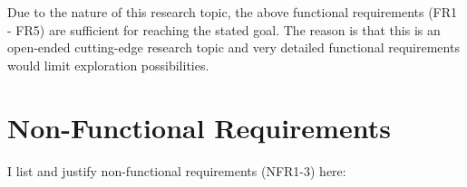 Due to the nature of this research topic, the above functional requirements (FR1 - FR5) are sufficient for reaching the stated goal. The reason is that this is an open-ended cutting-edge research topic and very detailed functional requirements would limit exploration possibilities.

% 
% 

\section{Non-Functional Requirements}
\quad I list and justify non-functional requirements (NFR1-3) here:

